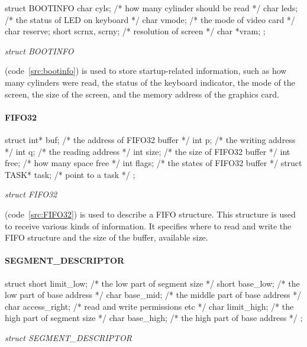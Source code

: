 \documentclass{swfcthesis}
\begin{document}
\begin{listing}[H]
  \begin{codeblock}
\begin{ccode}
struct BOOTINFO
{
  char cyls;          /* how many cylinder should be read */
  char leds;          /* the status of LED on keyboard */
  char vmode;         /* the mode of video card */
  char reserve;
  short scrnx, scrny; /* resolution of screen */
  char *vram;
};
\end{ccode}
  \end{codeblock}
  \caption{\emph{struct BOOTINFO}}\label{src:bootinfo}
\end{listing}

(code~\ref{src:bootinfo}) is used to store startup-related
information, such as how many cylinders were read, the status of the keyboard indicator,
the mode of the screen, the size of the screen, and the memory address of the graphics
card.


\paragraph{FIFO32}

\begin{listing}[H]
  \begin{codeblock}
\begin{ccode}
struct 
{ 
  int* buf;          /* the address of FIFO32 buffer */
  int p;             /* the writing address */
  int q;             /* the reading address */
  int size;          /* the size of FIFO32 buffer */
  int free;          /* how many space free */
  int flags;         /* the states of FIFO32 buffer */
  struct TASK* task; /* point to a task */ 
};
\end{ccode}
  \end{codeblock}
  \caption{\emph{struct FIFO32}}\label{src:FIFO32}
\end{listing}

(code~\ref{src:FIFO32}) is used to
describe a FIFO structure. This structure is used to receive various kinds of
information. It specifies where to read and write the FIFO structure and the size of the
buffer, available size.


\paragraph{SEGMENT\_DESCRIPTOR}

\begin{listing}[H]
  \begin{codeblock}
\begin{ccode}
struct 
{ 
  short limit_low;   /* the low part of segment size */
  short base_low;    /* the low part of base address */
  char base_mid;     /* the middle part of base address */
  char access_right; /* read and write permissions etc */
  char  limit_high;  /* the high part of segment size */
  char base_high;    /* the high part of base address */
};
\end{ccode}
  \end{codeblock}
  \caption{\emph{struct SEGMENT\_DESCRIPTOR}}\label{src:DESCRIPTOR}
\end{listing}
\end{document}
